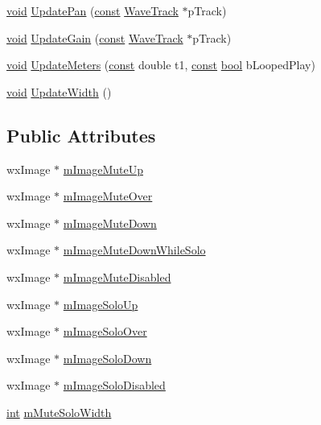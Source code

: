 \begin{DoxyCompactItemize}
\item 
\hyperlink{sound_8c_ae35f5844602719cf66324f4de2a658b3}{void} \hyperlink{class_mixer_board_a6386969f2b363e1ae510191e8e05182c}{Update\+Pan} (\hyperlink{getopt1_8c_a2c212835823e3c54a8ab6d95c652660e}{const} \hyperlink{class_wave_track}{Wave\+Track} $\ast$p\+Track)
\item 
\hyperlink{sound_8c_ae35f5844602719cf66324f4de2a658b3}{void} \hyperlink{class_mixer_board_a407ee5df1166fa5de4689299fcf2969a}{Update\+Gain} (\hyperlink{getopt1_8c_a2c212835823e3c54a8ab6d95c652660e}{const} \hyperlink{class_wave_track}{Wave\+Track} $\ast$p\+Track)
\item 
\hyperlink{sound_8c_ae35f5844602719cf66324f4de2a658b3}{void} \hyperlink{class_mixer_board_a4188ea7c4d6bb4e02250325ae8dffb32}{Update\+Meters} (\hyperlink{getopt1_8c_a2c212835823e3c54a8ab6d95c652660e}{const} double t1, \hyperlink{getopt1_8c_a2c212835823e3c54a8ab6d95c652660e}{const} \hyperlink{mac_2config_2i386_2lib-src_2libsoxr_2soxr-config_8h_abb452686968e48b67397da5f97445f5b}{bool} b\+Looped\+Play)
\item 
\hyperlink{sound_8c_ae35f5844602719cf66324f4de2a658b3}{void} \hyperlink{class_mixer_board_a2a3bd9bd262657b993d49dd3e41a28ca}{Update\+Width} ()
\end{DoxyCompactItemize}
\subsection*{Public Attributes}
\begin{DoxyCompactItemize}
\item 
wx\+Image $\ast$ \hyperlink{class_mixer_board_adf9eeecd5446a5fa241ae202883f0261}{m\+Image\+Mute\+Up}
\item 
wx\+Image $\ast$ \hyperlink{class_mixer_board_aecc55e89e36d2726b3c9d1cfa78f2139}{m\+Image\+Mute\+Over}
\item 
wx\+Image $\ast$ \hyperlink{class_mixer_board_a31a6143bd347f138733dcf7db3d91917}{m\+Image\+Mute\+Down}
\item 
wx\+Image $\ast$ \hyperlink{class_mixer_board_af3d103e4d95ef249d45bb016ddb5de5e}{m\+Image\+Mute\+Down\+While\+Solo}
\item 
wx\+Image $\ast$ \hyperlink{class_mixer_board_ab571e5598f9d9492d3ca015f9f37902a}{m\+Image\+Mute\+Disabled}
\item 
wx\+Image $\ast$ \hyperlink{class_mixer_board_aff0be038cf0ba7eaec8274eea4a94fdb}{m\+Image\+Solo\+Up}
\item 
wx\+Image $\ast$ \hyperlink{class_mixer_board_ac47db27c391c399a618dc4b29331bc0f}{m\+Image\+Solo\+Over}
\item 
wx\+Image $\ast$ \hyperlink{class_mixer_board_a127f82e91f5167ec87ff9e8484000a14}{m\+Image\+Solo\+Down}
\item 
wx\+Image $\ast$ \hyperlink{class_mixer_board_a866c6b6aae90c8dbf4722a2f20b3440a}{m\+Image\+Solo\+Disabled}
\item 
\hyperlink{xmltok_8h_a5a0d4a5641ce434f1d23533f2b2e6653}{int} \hyperlink{class_mixer_board_adc5c028a80b872f3ab4c8815367e033b}{m\+Mute\+Solo\+Width}
\end{DoxyCompactItemize}
